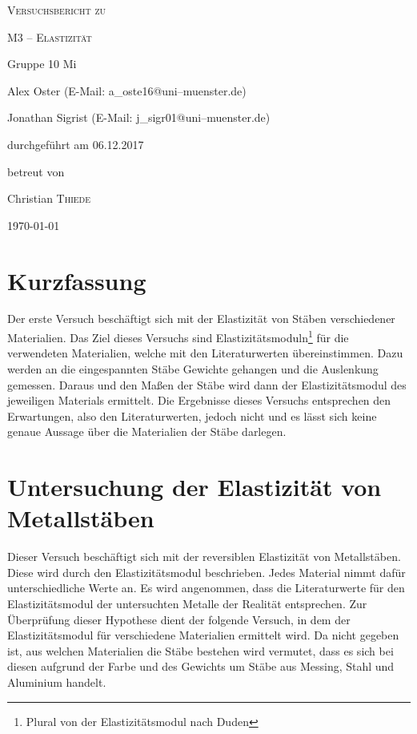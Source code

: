 \documentclass[11pt,a4paper,titlepage, ngerman]{article}
\begin{document}
	\begin{titlepage}
		\centering
		{\scshape\LARGE Versuchsbericht zu \par}
		\vspace{1cm}
		{\scshape\huge M3 -- Elastizität\par}
		\vspace{2.5cm}
		{\LARGE Gruppe 10 Mi\par}
		\vspace{0.5cm}
		{\large Alex Oster (E-Mail: a\_oste16@uni--muenster.de) \par}
		{\large Jonathan Sigrist (E-Mail: j\_sigr01@uni--muenster.de) \par}
		\vfill
		durchgeführt am 06.12.2017\par
		betreut von\par
		{\large Christian \textsc{Thiede}}		
		\vfill	
		{\large \today\par}
	\end{titlepage}
		
	\tableofcontents
		
	\newpage
	
	\section{Kurzfassung}
		
		Der erste Versuch beschäftigt sich mit der Elastizität von Stäben verschiedener Materialien. Das Ziel dieses Versuchs sind Elastizitätsmoduln\footnote{Plural von \glqq der Elastizitätsmodul\grqq {} nach Duden} für die verwendeten Materialien, welche mit den Literaturwerten übereinstimmen. Dazu werden an die eingespannten Stäbe Gewichte gehangen und die Auslenkung gemessen. Daraus und den Maßen der Stäbe wird dann der Elastizitätsmodul des jeweiligen Materials ermittelt. Die Ergebnisse dieses Versuchs entsprechen den Erwartungen, also den Literaturwerten, jedoch nicht und es lässt sich keine genaue Aussage über die Materialien der Stäbe darlegen.
	
	\section{Untersuchung der Elastizität von Metallstäben}
		
		Dieser Versuch beschäftigt sich mit der reversiblen Elastizität von Metallstäben. Diese wird durch den Elastizitätsmodul beschrieben. Jedes Material nimmt dafür unterschiedliche Werte an. 
		Es wird angenommen, dass die Literaturwerte für den Elastizitätsmodul der untersuchten Metalle der Realität entsprechen. Zur Überprüfung dieser Hypothese dient der folgende Versuch, in dem der Elastizitätsmodul für verschiedene Materialien ermittelt wird.
		Da nicht gegeben ist, aus welchen Materialien die Stäbe bestehen wird vermutet, dass es sich bei diesen aufgrund der Farbe und des Gewichts um Stäbe aus Messing, Stahl und Aluminium handelt.
						
\end{document}
